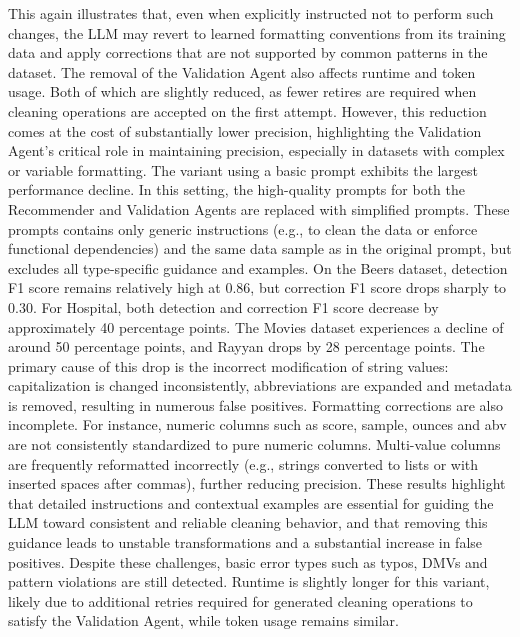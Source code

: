 This again illustrates that, even when explicitly instructed not to perform such changes, the LLM may revert to learned formatting conventions from its training data and apply corrections that are not supported by common patterns in the dataset.
The removal of the Validation Agent also affects runtime and token usage.
Both of which are slightly reduced, as fewer retires are required when cleaning operations are accepted on the first attempt.
However, this reduction comes at the cost of substantially lower precision, highlighting the Validation Agent's critical role in maintaining precision, especially in datasets with complex or variable formatting.
\newline\newline
The variant using a basic prompt exhibits the largest performance decline. 
In this setting, the high-quality prompts for both the Recommender and Validation Agents are replaced with simplified prompts.
These prompts contains only generic instructions (e.g., to clean the data or enforce functional dependencies) and the same data sample as in the original prompt, but excludes all type-specific guidance and examples.
On the Beers dataset, detection F1 score remains relatively high at 0.86, but correction F1 score drops sharply to 0.30. 
For Hospital, both detection and correction F1 score decrease by approximately 40 percentage points. 
The Movies dataset experiences a decline of around 50 percentage points, and Rayyan drops by 28 percentage points. 
The primary cause of this drop is the incorrect modification of string values: capitalization is changed inconsistently, abbreviations are expanded and metadata is removed, resulting in numerous false positives. 
Formatting corrections are also incomplete.
For instance, numeric columns such as score, sample, ounces and abv are not consistently standardized to pure numeric columns. 
Multi-value columns are frequently reformatted incorrectly (e.g., strings converted to lists or with inserted spaces after commas), further reducing precision. 
These results highlight that detailed instructions and contextual examples are essential for guiding the LLM toward consistent and reliable cleaning behavior, and that removing this guidance leads to unstable transformations and a substantial increase in false positives.
Despite these challenges, basic error types such as typos, DMVs and pattern violations are still detected. 
Runtime is slightly longer for this variant, likely due to additional retries required for generated cleaning operations to satisfy the Validation Agent, while token usage remains similar.

